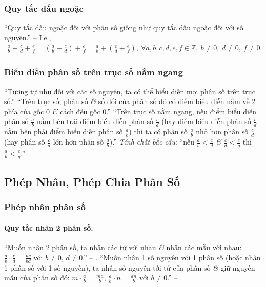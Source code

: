 \documentclass{article}
\numberwithin{equation}{section}
\begin{document}
\subsubsection{Quy tắc dấu ngoặc}
``Quy tắc dấu ngoặc đối với phân số giống như quy tắc dấu ngoặc đối với số nguyên.'' -- \cite[p. 37]{Thai_Anh_Dat_Ha_Loan_Nam_Quang_Toan_6_tap_2} I.e.,
\begin{align*}
	\frac{a}{b} + \frac{c}{d} + \frac{e}{f} = \left(\frac{a}{b} + \frac{c}{d}\right) + \frac{e}{f} = \frac{a}{b} + \left(\frac{c}{d} + \frac{e}{f}\right),\ \forall a,b,c,d,e,f\in\mathbb{Z},\ b\ne 0,\ d\ne 0,\ f\ne 0.
\end{align*}

\subsubsection{Biểu diễn phân số trên trục số nằm ngang}
``Tương tự như đối với các số nguyên, ta có thể biểu diễn mọi phân số trên trục số.'' ``Trên trục số, phân số \textit{\&} số đối của phân số đó có điểm biểu diễn nằm về 2 phía của gốc 0 \textit{\&} cách đều gốc 0.'' ``Trên trục số nằm ngang, nếu điểm biểu diễn phân số $\frac{a}{b}$ nằm bên trái điểm biểu diễn phân số $\frac{c}{d}$ (hay điểm biểu diễn phân số $\frac{c}{d}$ nằm bên phải điểm biểu diễn phân số $\frac{a}{b}$) thì ta có phân số $\frac{a}{b}$ nhỏ hơn phân số $\frac{c}{d}$ (hay phân số $\frac{c}{d}$ lớn hơn phân số $\frac{a}{b}$).'' \textit{Tính chất bắc cầu}: ``nếu $\frac{a}{b} < \frac{c}{d}$ \textit{\&} $\frac{c}{d} < \frac{e}{g}$ thì $\frac{a}{b} < \frac{e}{g}$.'' -- \cite[p. 39]{Thai_Anh_Dat_Ha_Loan_Nam_Quang_Toan_6_tap_2}

\subsection{Phép Nhân, Phép Chia Phân Số}

\subsubsection{Phép nhân phân số}

\paragraph{Quy tắc nhân 2 phân số.} ``Muốn nhân 2 phân số, ta nhân các tử với nhau \textit{\&} nhân các mẫu với nhau: $\frac{a}{b}\cdot\frac{c}{d} = \frac{ac}{bd}$ với $b\ne 0$, $d\ne 0$.'' -- \cite[p. 40]{Thai_Anh_Dat_Ha_Loan_Nam_Quang_Toan_6_tap_2}. ``Muốn nhân 1 số nguyên với 1 phân số (hoặc nhân 1 phân số với 1 số nguyên), ta nhân số nguyên tới tử của phân số \textit{\&} giữ nguyên mẫu của phân số đó: $m\cdot\frac{a}{b} = \frac{ma}{b}$, $\frac{a}{b}\cdot n = \frac{an}{b}$ với $b\ne 0$.'' -- \cite[p. 41]{Thai_Anh_Dat_Ha_Loan_Nam_Quang_Toan_6_tap_2}
\end{document}
